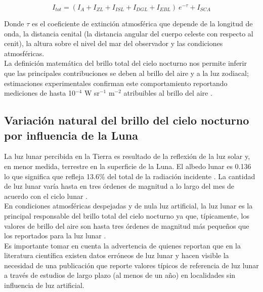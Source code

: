 \begin{equation}
I_{tot} = (I_A + I_{ZL} + I_{ISL} + I_{DGL} + I_{EBL})\:e^{-\tau} + I_{SCA}
\end{equation}

\vspace{2mm} 

Donde $\tau$ es el coeficiente de extinción atmosférica que depende de la longitud de onda, la distancia cenital (la distancia angular del cuerpo celeste con respecto al cenit), la altura sobre el nivel del mar del observador y las condiciones atmosféricas.\\ 

La definición matemática del brillo total del cielo nocturno nos permite inferir que las principales contribuciones se deben al brillo del aire y a la luz zodiacal; estimaciones experimentales confirman este comportamiento reportando mediciones de hasta 10$^{-4}$ W sr$^{-1}$  m$^{-2}$ atribuibles al brillo del aire \citep{Leinert1998}.\\ 

\subsection{Variación natural del brillo del cielo nocturno por influencia de la Luna}

La luz lunar percibida en la Tierra es resultado de la reflexión de la luz solar y, en menor medida, terrestre en la superficie de la Luna. El albedo lunar es 0.136 lo que significa que refleja 13.6\% del total de la radiación incidente \citep{Matthews2008}. La cantidad de luz lunar varía hasta en tres órdenes de magnitud a lo largo del mes de acuerdo con el ciclo lunar \citep{Kyba2017}.\\

En condiciones atmosféricas despejadas y de nula luz artificial, la luz lunar es la principal responsable del brillo total del cielo nocturno ya que, típicamente, los valores de brillo del aire son hasta tres órdenes de magnitud más pequeños que los reportados para la luz lunar \citep{Hanel2018}.\\

Es importante tomar en cuenta la advertencia de \cite{Kyba2017} quienes reportan que en la literatura científica existen datos erróneos de luz lunar y hacen visible la necesidad de una publicación que reporte valores típicos de referencia de luz lunar a través de estudios de largo plazo (al menos de un año) en localidades sin influencia de luz artificial.\\ 

